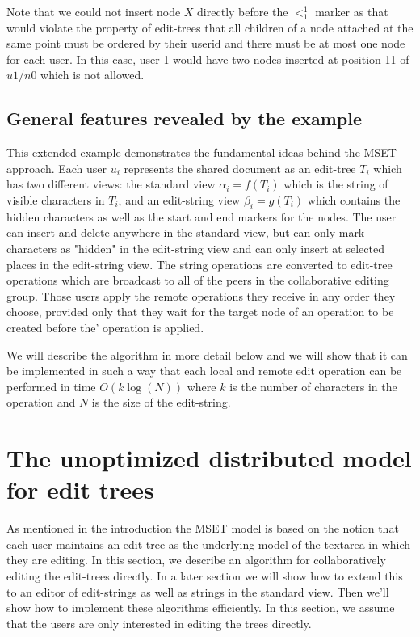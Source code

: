 \documentclass{amsart}
\begin{document}
Note that we could not insert node $X$ directly before the $<^1_1$ marker
as that would violate the property of edit-trees that all children of a
node attached at the same point must be ordered by their userid and there
must be at most one node for each user. In this case, user 1 would have two
nodes inserted at position 11 of $u1/n0$ which is not allowed.

\subsection{General features revealed by the example}
This extended example demonstrates the fundamental ideas behind the MSET
approach. Each user $u_i$ represents the shared document as an edit-tree $T_i$
which has two different views: the standard view $\alpha_i = f(T_i)$ which
is the string of visible characters in $T_i$, and an edit-string view
$\beta_i = g(T_i)$ which contains the hidden characters as well as the
start and end markers for the nodes. The user can insert and delete anywhere
in the standard view, but can only mark characters as "hidden" in the
edit-string view and can only insert at selected places in the edit-string
view. The string operations are converted to edit-tree operations which are
broadcast to all of the peers in the collaborative editing group. Those users
apply the remote operations they receive in any order they choose, provided only
that they wait for the target node of an operation to be created before the'
operation is applied.

We will describe the algorithm in more detail below and we will show that it
can be implemented in such a way that each local and remote edit operation
can be performed in time $O(k\log(N))$ where $k$ is the number of characters
in the operation and $N$ is the size of the edit-string.



\section{The unoptimized distributed model for edit trees}
\label{sec:edittrees}

As mentioned in the introduction the MSET model is based on the notion that 
each user maintains an edit tree as the underlying model of the textarea in
which they are editing. In this section, we describe an algorithm for 
collaboratively editing the edit-trees directly. In a later section we will show
how to extend this to an editor of edit-strings as well as strings in
the standard view. Then we'll show how to implement these algorithms
efficiently. In this section, we assume that the users are only interested in editing
the trees directly.
\end{document}
